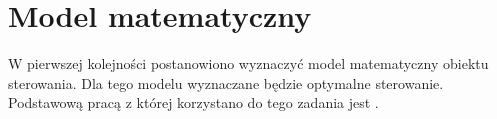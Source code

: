 \section{Model matematyczny}
\label{sec:model}

W pierwszej kolejności postanowiono wyznaczyć model matematyczny obiektu sterowania. Dla tego modelu wyznaczane będzie optymalne sterowanie. Podstawową pracą z której korzystano do tego zadania jest \cite{Babazadeh}.